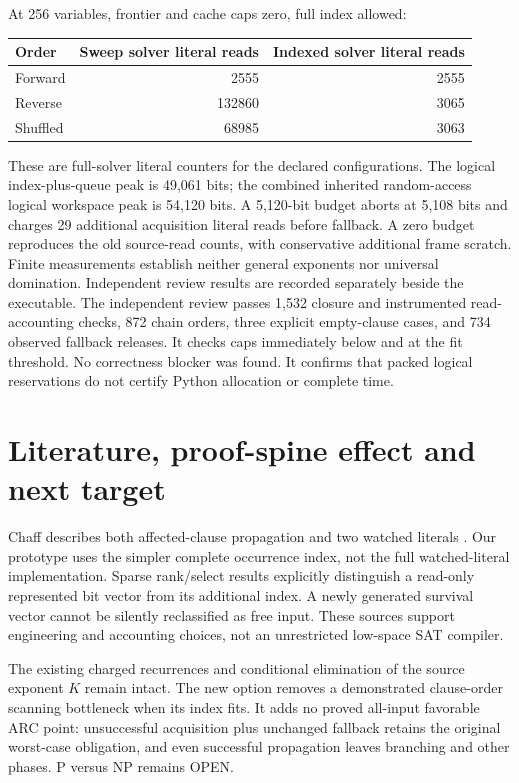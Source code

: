 \documentclass[11pt]{article}
\begin{document}
At 256 variables, frontier and cache caps zero, full index allowed:
\begin{center}
\begin{tabular}{lrr}
\toprule
Order & Sweep solver literal reads & Indexed solver literal reads\\
\midrule
Forward & 2555 & 2555\\
Reverse & 132860 & 3065\\
Shuffled & 68985 & 3063\\
\bottomrule
\end{tabular}
\end{center}
These are full-solver literal counters for the declared configurations.
The logical index-plus-queue peak is 49,061 bits; the combined inherited
random-access logical workspace peak is 54,120 bits. A 5,120-bit budget
aborts at 5,108 bits and charges 29 additional acquisition literal reads
before fallback. A zero budget reproduces the old source-read counts,
with conservative additional frame scratch. Finite measurements establish
neither general exponents nor universal domination. Independent review
results are recorded separately beside the executable. The independent
review passes 1,532 closure and instrumented read-accounting checks,
872 chain orders, three explicit empty-clause cases, and 734 observed
fallback releases. It checks caps immediately below and at the fit
threshold. No correctness blocker was found. It confirms that packed
logical reservations do not certify Python allocation or complete time.

\section{Literature, proof-spine effect and next target}
Chaff describes both affected-clause propagation and two watched literals
\cite{chaff}. Our prototype uses the simpler complete occurrence index,
not the full watched-literal implementation. Sparse rank/select results
\cite{sparse} explicitly distinguish a read-only represented bit vector
from its additional index. A newly generated survival vector cannot be
silently reclassified as free input. These sources support engineering
and accounting choices, not an unrestricted low-space SAT compiler.

The existing charged recurrences and conditional elimination of the
source exponent $K$ remain intact. The new option removes a demonstrated
clause-order scanning bottleneck when its index fits. It adds no proved
all-input favorable ARC point: unsuccessful acquisition plus unchanged
fallback retains the original worst-case obligation, and even successful
propagation leaves branching and other phases. P versus NP remains OPEN.
\end{document}
